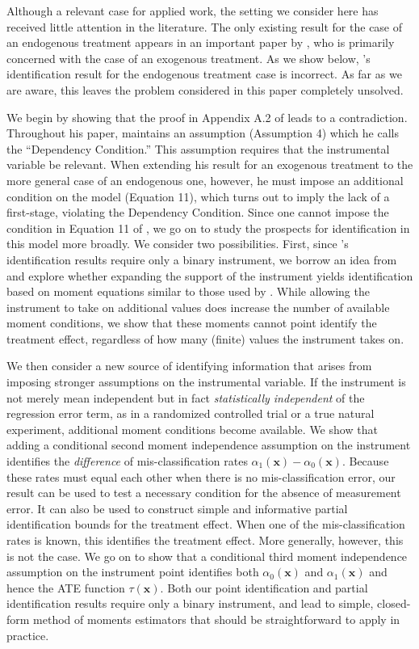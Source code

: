 Although a relevant case for applied work, the setting we consider here has received little attention in the literature.
The only existing result for the case of an endogenous treatment appears in an important paper by \cite{Mahajan}, who is primarily concerned with the case of an exogenous treatment.
As we show below, \citeauthor{Mahajan}'s identification result for the endogenous treatment case is incorrect.
As far as we are aware, this leaves the problem considered in this paper completely unsolved.

We begin by showing that the proof in Appendix A.2 of \cite{Mahajan} leads to a contradiction.
Throughout his paper, \cite{Mahajan} maintains an assumption (Assumption 4) which he calls the ``Dependency Condition.'' 
This assumption requires that the instrumental variable be relevant.
When extending his result for an exogenous treatment to the more general case of an endogenous one, however, he must impose an additional condition on the model (Equation 11), which turns out to imply the lack of a first-stage, violating the Dependency Condition.
Since one cannot impose the condition in Equation 11 of \cite{Mahajan}, we go on to study the prospects for identification in this model more broadly.
We consider two possibilities.
First, since \citeauthor{Mahajan}'s identification results require only a binary instrument,  we borrow an idea from \cite{Lewbel} and explore whether expanding the support of the instrument yields identification based on moment equations similar to those used by \cite{Mahajan}.
While allowing the instrument to take on additional values does increase the number of available moment conditions, we show that these moments cannot point identify the treatment effect, regardless of how many (finite) values the instrument takes on.

We then consider a new source of identifying information that arises from imposing stronger assumptions on the instrumental variable.
If the instrument is not merely mean independent but in fact \emph{statistically independent} of the regression error term, as in a randomized controlled trial or a true natural experiment, additional moment conditions become available.
We show that adding a conditional second moment independence assumption on the instrument identifies the \emph{difference} of mis-classification rates $\alpha_1(\mathbf{x})-\alpha_0(\mathbf{x})$. 
Because these rates must equal each other when there is no mis-classification error, our result can be used to test a necessary condition for the absence of measurement error.   
It can also be used to construct simple and informative partial identification bounds for the treatment effect.
When one of the mis-classification rates is known, this identifies the treatment effect.
More generally, however, this is not the case.
We go on to show that a conditional third moment independence assumption on the instrument point identifies both $\alpha_0(\mathbf{x})$ and $\alpha_1(\mathbf{x})$ and hence the ATE function $\tau(\mathbf{x})$. 
Both our point identification and partial identification results require only a binary instrument, and lead to simple, closed-form method of moments estimators that should be straightforward to apply in practice.

